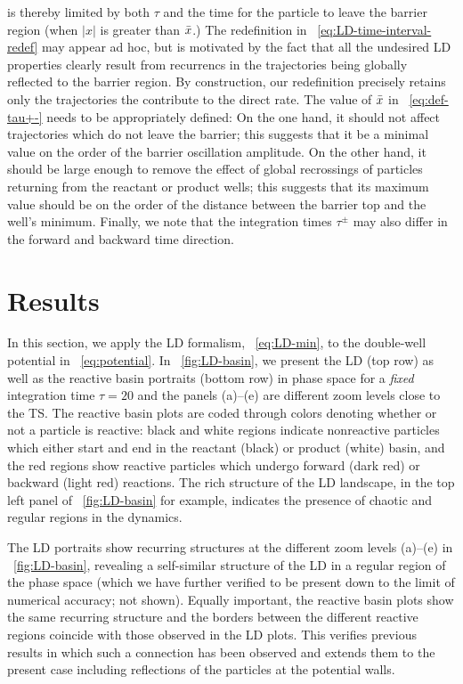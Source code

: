 \documentclass[aip,reprint,jcp,amsmath,amssymb,superscriptaddress,floatfix]{revtex4-1}
\def\EDITS#1{{\color{green}#1}}
\def\EDITS#1{#1}
\def\EDITS#1{{\color{mygreen}#1}}
\begin{document}
is thereby limited by both $\tau$ and the time for the particle to
leave the barrier region (when $|x|$ is greater than $\bar{x}$.)
\EDITS{The redefinition 
in \EQ~\eqref{eq:LD-time-interval-redef} may appear ad hoc, but is
motivated by the fact that all the undesired LD properties clearly result from 
recurrencs in the
trajectories being globally reflected to the barrier region. By construction,
our redefinition precisely retains only the
trajectories the contribute to the direct rate.}
The value of $\bar{x}$ in \EQ~\eqref{eq:def-tau+-} needs to be appropriately defined:
On the one hand, it should not affect trajectories which do not leave the 
barrier; this suggests 
that it be a minimal value on the order of the barrier 
oscillation amplitude.
On the other hand, it should be large enough
to remove the effect of global recrossings
of particles returning from the reactant or product wells;
this suggests that its maximum value should be on 
the order of the distance between the barrier top and the well's minimum.
% 
Finally, we note that the integration times $\tau^\pm$ may also differ in the 
forward and backward time direction. 


\section{Results}\label{sec:results}

In this section, we apply the LD formalism, \EQ~\eqref{eq:LD-min}, to the 
double-well potential in \EQ~\eqref{eq:potential}.
% 
In \FIG~\ref{fig:LD-basin}, we present the LD (top row) as well as the reactive 
basin portraits (bottom row) in phase space for a \emph{fixed} integration 
time $\tau=20$ and the panels \mbox{(a)--(e)} are different zoom levels close 
to the TS.
The reactive basin plots are 
coded through colors denoting
whether or not a particle is reactive:
black and white regions indicate nonreactive particles which either start and 
end in the reactant (black) or product (white) basin, and the red regions show 
reactive particles which undergo forward (dark red) or backward (light red) 
reactions.
The rich structure of the LD landscape, in the top left panel 
of \FIG~\ref{fig:LD-basin} for example, indicates the presence
of chaotic and regular regions in the dynamics.


The LD portraits show recurring 
structures at the different zoom levels \mbox{(a)--(e)} 
in \FIG~\ref{fig:LD-basin},
revealing a 
self-similar structure of the LD 
in a regular region of the phase space
(which we have further verified to be present down to the limit of numerical 
accuracy; not shown).
Equally important,
the reactive basin plots show the same 
recurring structure and the borders between the different reactive regions 
coincide with those observed in the LD plots.
This verifies previous results \cite{hern16d,hern16h} in which 
such a connection 
has been observed and extends them to the 
present case including reflections of the 
particles at the potential walls.
\end{document}
